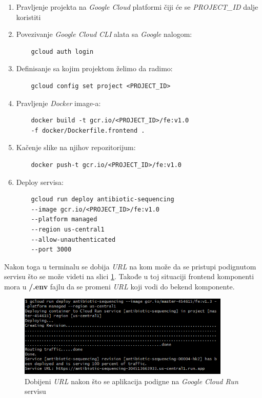 \documentclass[12pt,oneside]{memoir}
\begin{document}
\begin{enumerate}
\item Pravljenje projekta na \emph{Google Cloud} platformi čiji će se \emph{PROJECT\_ID} dalje koristiti
\item Povezivanje \emph{Google Cloud CLI} alata sa \emph{Google} nalogom:
\begin{verbatim}
    gcloud auth login
\end{verbatim}
\item Definisanje sa kojim projektom želimo da radimo:
\begin{verbatim}
    gcloud config set project <PROJECT_ID>
\end{verbatim}
\item Pravljenje \emph{Docker} image-a:
\begin{verbatim}
    docker build -t gcr.io/<PROJECT_ID>/fe:v1.0 
    -f docker/Dockerfile.frontend .
\end{verbatim}
\item Kačenje slike na njihov repozitorijum:
\begin{verbatim}
    docker push-t gcr.io/<PROJECT_ID>/fe:v1.0
\end{verbatim}
\item Deploy servisa: 
\begin{verbatim}
    gcloud run deploy antibiotic-sequencing 
    --image gcr.io/<PROJECT_ID>/fe:v1.0 
    --platform managed 
    --region us-central1
    --allow-unauthenticated 
    --port 3000
\end{verbatim}
\end{enumerate}

Nakon toga u terminalu se dobija \emph{URL} na kom može da se pristupi podignutom servisu što se može videti na slici \ref{fig:gcr_deploy}. Takođe u toj situaciji frontend komponenti mora u \textbf{/.env} fajlu da se promeni \emph{URL} koji vodi do bekend komponente.

\begin{figure}[h]
\centering
\includegraphics[width=0.9\textwidth]{images/gcr_deploy.png}
\caption{Dobijeni \emph{URL} nakon što se aplikacija podigne na \emph{Google Cloud Run} servisu}
\label{fig:gcr_deploy}
\end{figure}
\end{document}
